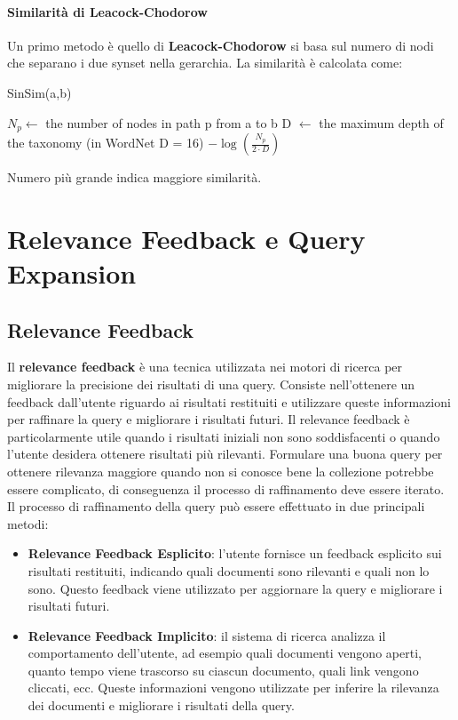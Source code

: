 \documentclass{report}
\begin{document}
	\subsubsection{Similarità di Leacock-Chodorow}
	Un primo metodo è quello di \textbf{Leacock-Chodorow} si basa sul numero di nodi che separano i due synset nella gerarchia. La similarità è calcolata come:
	\begin{algorithm}[H]
		\caption{SinSim(a,b)}
		\begin{algorithmic}
			\State $N_p \leftarrow$ the number of nodes in path p from a to b
			\State D $\leftarrow$ the maximum depth of the taxonomy (in WordNet D = 16)
			\State \Return $- \log \left( \frac{N_p}{2 \cdot D} \right)$
		\end{algorithmic}
	\end{algorithm}
	Numero più grande indica maggiore similarità.

	\chapter{Relevance Feedback e Query Expansion}
	\section{Relevance Feedback}
	Il \textbf{relevance feedback} è una tecnica utilizzata nei motori di ricerca per migliorare la precisione dei risultati di una query. Consiste nell'ottenere un feedback dall'utente riguardo ai risultati restituiti e utilizzare queste informazioni per raffinare la query e migliorare i risultati futuri. Il relevance feedback è particolarmente utile quando i risultati iniziali non sono soddisfacenti o quando l'utente desidera ottenere risultati più rilevanti. Formulare una buona query per ottenere rilevanza maggiore quando non si conosce bene la collezione potrebbe essere complicato, di conseguenza il processo di raffinamento deve essere iterato.
	\vspace{\baselineskip}\\
	Il processo di raffinamento della query può essere effettuato in due principali metodi:
	\begin{itemize}
		\item \textbf{Relevance Feedback Esplicito}: l'utente fornisce un feedback esplicito sui risultati restituiti, indicando quali documenti sono rilevanti e quali non lo sono. Questo feedback viene utilizzato per aggiornare la query e migliorare i risultati futuri.
		\item \textbf{Relevance Feedback Implicito}: il sistema di ricerca analizza il comportamento dell'utente, ad esempio quali documenti vengono aperti, quanto tempo viene trascorso su ciascun documento, quali link vengono cliccati, ecc. Queste informazioni vengono utilizzate per inferire la rilevanza dei documenti e migliorare i risultati della query.
	\end{itemize}
\end{document}
